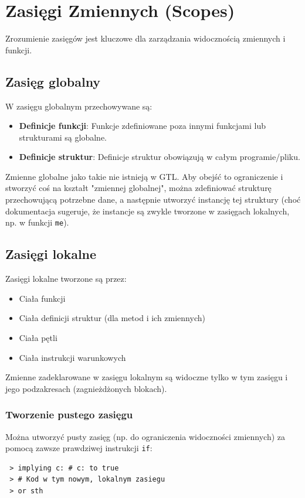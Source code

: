 \documentclass[12pt,a4paper]{article}
\begin{document}
\newpage
\section{Zasięgi Zmiennych (Scopes)}
\label{sec:scopes}
Zrozumienie zasięgów jest kluczowe dla zarządzania widocznością zmiennych i funkcji.

\subsection{Zasięg globalny}
W zasięgu globalnym przechowywane są:
\begin{itemize}
    \item \textbf{Definicje funkcji}: Funkcje zdefiniowane poza innymi funkcjami lub strukturami są globalne.
    \item \textbf{Definicje struktur}: Definicje struktur obowiązują w całym programie/pliku.
\end{itemize}
Zmienne globalne jako takie nie istnieją w GTL. Aby obejść to ograniczenie i stworzyć coś na kształt "zmiennej globalnej", można zdefiniować strukturę przechowującą potrzebne dane, a następnie utworzyć instancję tej struktury (choć dokumentacja sugeruje, że instancje są zwykle tworzone w zasięgach lokalnych, np. w funkcji \texttt{me}).

\subsection{Zasięgi lokalne}
Zasięgi lokalne tworzone są przez:
\begin{itemize}
    \item Ciała funkcji
    \item Ciała definicji struktur (dla metod i ich zmiennych)
    \item Ciała pętli
    \item Ciała instrukcji warunkowych
\end{itemize}
Zmienne zadeklarowane w zasięgu lokalnym są widoczne tylko w tym zasięgu i jego podzakresach (zagnieżdżonych blokach).

\subsubsection{Tworzenie pustego zasięgu}
Można utworzyć pusty zasięg (np. do ograniczenia widoczności zmiennych) za pomocą zawsze prawdziwej instrukcji \texttt{if}:
\begin{lstlisting}
 > implying c: # c: to true
 > # Kod w tym nowym, lokalnym zasiegu
 > or sth
\end{lstlisting}
\end{document}
